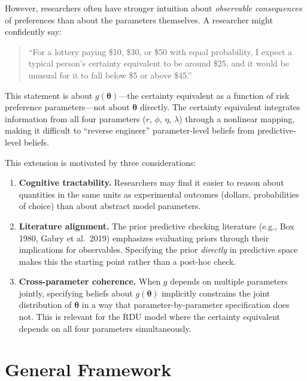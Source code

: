 \documentclass[11pt,a4paper]{article}
\theoremstyle{definition}
\newcommand{\btheta}{\boldsymbol{\theta}}
\begin{document}
However, researchers often have stronger intuition about \emph{observable
consequences} of preferences than about the parameters themselves. A researcher
might confidently say:
\begin{quote}
    ``For a lottery paying \$10, \$30, or \$50 with equal probability, I expect
    a typical person's certainty equivalent to be around \$25, and it would be
    unusual for it to fall below \$5 or above \$45.''
\end{quote}
This statement is about $g(\btheta)$---the certainty equivalent as a function
of risk preference parameters---not about $\btheta$ directly. The certainty
equivalent integrates information from all four parameters ($r$, $\phi$,
$\eta$, $\lambda$) through a nonlinear mapping, making it difficult to
``reverse engineer'' parameter-level beliefs from predictive-level beliefs.

This extension is motivated by three considerations:

\begin{enumerate}
    \item \textbf{Cognitive tractability.} Researchers may find it easier to
    reason about quantities in the same units as experimental outcomes (dollars,
    probabilities of choice) than about abstract model parameters.

    \item \textbf{Literature alignment.} The prior predictive checking
    literature (e.g., Box 1980, Gabry et al.\ 2019) emphasizes evaluating
    priors through their implications for observables. Specifying the prior
    \emph{directly} in predictive space makes this the starting point rather
    than a post-hoc check.

    \item \textbf{Cross-parameter coherence.} When $g$ depends on multiple
    parameters jointly, specifying beliefs about $g(\btheta)$ implicitly
    constrains the joint distribution of $\btheta$ in a way that
    parameter-by-parameter specification does not. This is relevant for the RDU
    model where the certainty equivalent depends on all four parameters
    simultaneously.
\end{enumerate}

\section{General Framework}
\end{document}
